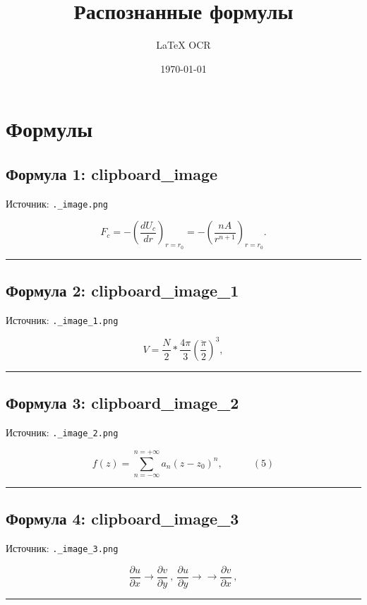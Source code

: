 \documentclass{article}
\title{Распознанные формулы}
\author{LaTeX OCR}
\date{\today}
\begin{document}
\maketitle

\section{Формулы}

\subsection{Формула 1: clipboard_image}

Источник: \texttt{.\clipboard_image.png}

\begin{equation}
\tag{clipboard_image}
F_{c}=-\left(\frac{d U_{c}}{d r}\right)_{r=r_{0}}=-\left(\frac{n A}{r^{n+1}}\right)_{r=r_{0}}.
\end{equation}

\hrule

\subsection{Формула 2: clipboard_image_1}

Источник: \texttt{.\clipboard_image_1.png}

\begin{equation}
\tag{clipboard_image_1}
V={\frac{N}{2}}\ast{\frac{4\pi}{3}}\left({\frac{\ddot{\pi}}{2}}\right)^{3},
\end{equation}

\hrule

\subsection{Формула 3: clipboard_image_2}

Источник: \texttt{.\clipboard_image_2.png}

\begin{equation}
\tag{clipboard_image_2}
f(z)=\sum_{n=-\infty}^{n=+\infty}a_{n}\left(z-z_{0}\right)^{n},\quad\quad\quad(5)
\end{equation}

\hrule

\subsection{Формула 4: clipboard_image_3}

Источник: \texttt{.\clipboard_image_3.png}

\begin{equation}
\tag{clipboard_image_3}
{\frac{\partial u}{\partial x}}\longrightarrow{\frac{\partial v}{\partial y}}~,~{\frac{\partial u}{\partial y}}\longrightarrow\longrightarrow{\frac{\partial v}{\partial x}}\,,
\end{equation}

\hrule
\end{document}
